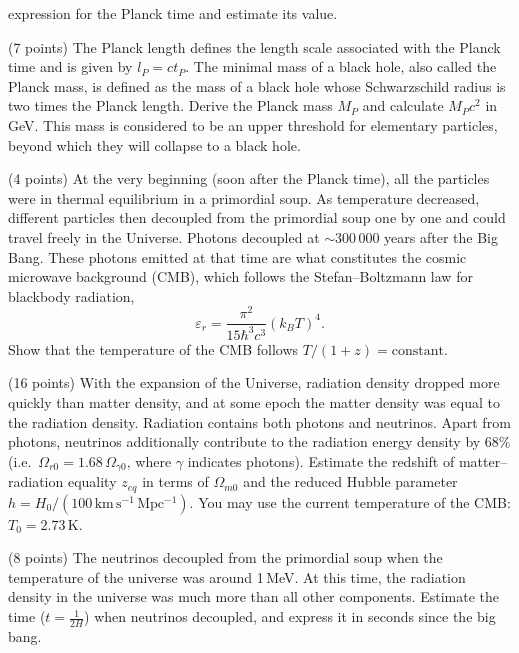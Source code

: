 \begin{description}
  expression for the Planck time and estimate its value.
\item[(g)] (7 points) The Planck length defines the length scale associated
  with the Planck time and is given by $l_P = ct_P$. The minimal mass of a
  black hole, also called the Planck mass, is defined as the mass of a black
  hole whose Schwarzschild radius is two times the Planck length. Derive the
  Planck mass $M_P$ and calculate $M_P c^2$ in GeV. This mass is considered to
  be an upper threshold for elementary particles, beyond which they will
  collapse to a black hole.
\item[(h)] (4 points) At the very beginning (soon after the Planck time), all
  the particles were in thermal equilibrium in a primordial soup. As
  temperature decreased, different particles then decoupled from the
  primordial soup one by one and could travel freely in the Universe. Photons
  decoupled at ${\sim}300\,000$ years after the Big Bang. These photons
  emitted at that time are what constitutes the cosmic microwave background
  (CMB), which follows the Stefan--Boltzmann law for blackbody radiation,
  \[ \varepsilon_r = \frac{\pi^2}{15\hbar^3 c^3}(k_B T)^4. \]
  Show that the temperature of the CMB follows $T/(1+z) = \mathrm{constant}$.
\item[(i)] (16 points) With the expansion of the Universe, radiation density
  dropped more quickly than matter density, and at some epoch the matter
  density was equal to the radiation density. Radiation contains both photons
  and neutrinos. Apart from photons, neutrinos additionally contribute to the
  radiation energy density by 68\% (i.e.\
  $\Omega_{r0} = 1.68\,\Omega_{\gamma 0}$, where $\gamma$ indicates photons).
  Estimate the redshift of matter--radiation equality $z_{eq}$ in terms of
  $\Omega_{m0}$ and the reduced Hubble parameter
  $h = H_0/(100\,\mathrm{km\,s^{-1}\,Mpc^{-1}})$. You may use the current
  temperature of the CMB: $T_0 = 2.73$\,K.
\item[(j)] (8 points) The neutrinos decoupled from the primordial soup when
  the temperature of the universe was around 1\,MeV. At this time, the
  radiation density in the universe was much more than all other components.
  Estimate the time ($t = \frac{1}{2H}$) when neutrinos decoupled, and express
  it in seconds since the big bang.
\end{description}
